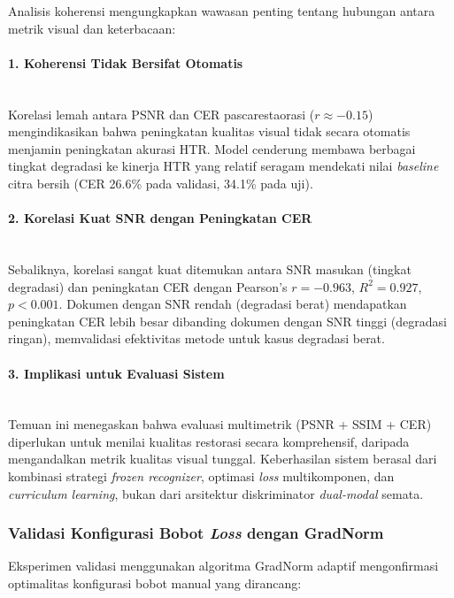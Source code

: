 \documentclass[12pt,a4paper]{article}
\begin{document}
Analisis koherensi mengungkapkan wawasan penting tentang hubungan antara metrik visual dan keterbacaan:

\paragraph{1. Koherensi Tidak Bersifat Otomatis} \mbox{}\\[0.1em]
Korelasi lemah antara PSNR dan CER pascarestaorasi ($r \approx -0.15$) mengindikasikan bahwa peningkatan kualitas visual tidak secara otomatis menjamin peningkatan akurasi HTR. Model cenderung membawa berbagai tingkat degradasi ke kinerja HTR yang relatif seragam mendekati nilai \textit{baseline} citra bersih (CER 26.6\% pada validasi, 34.1\% pada uji).

\paragraph{2. Korelasi Kuat SNR dengan Peningkatan CER} \mbox{}\\[0.1em]
Sebaliknya, korelasi sangat kuat ditemukan antara SNR masukan (tingkat degradasi) dan peningkatan CER dengan Pearson's $r = -0.963$, $R^2 = 0.927$, $p < 0.001$. Dokumen dengan SNR rendah (degradasi berat) mendapatkan peningkatan CER lebih besar dibanding dokumen dengan SNR tinggi (degradasi ringan), memvalidasi efektivitas metode untuk kasus degradasi berat.

\paragraph{3. Implikasi untuk Evaluasi Sistem} \mbox{}\\[0.1em]
Temuan ini menegaskan bahwa evaluasi multimetrik (PSNR + SSIM + CER) diperlukan untuk menilai kualitas restorasi secara komprehensif, daripada mengandalkan metrik kualitas visual tunggal. Keberhasilan sistem berasal dari kombinasi strategi \textit{frozen recognizer}, optimasi \textit{loss} multikomponen, dan \textit{curriculum learning}, bukan dari arsitektur diskriminator \textit{dual-modal} semata.

\vspace{0.8em}

\subsubsection{Validasi Konfigurasi Bobot \textit{Loss} dengan GradNorm}
\label{subsubsec:validasi-gradnorm}

Eksperimen validasi menggunakan algoritma GradNorm adaptif mengonfirmasi optimalitas konfigurasi bobot manual yang dirancang:
\end{document}
